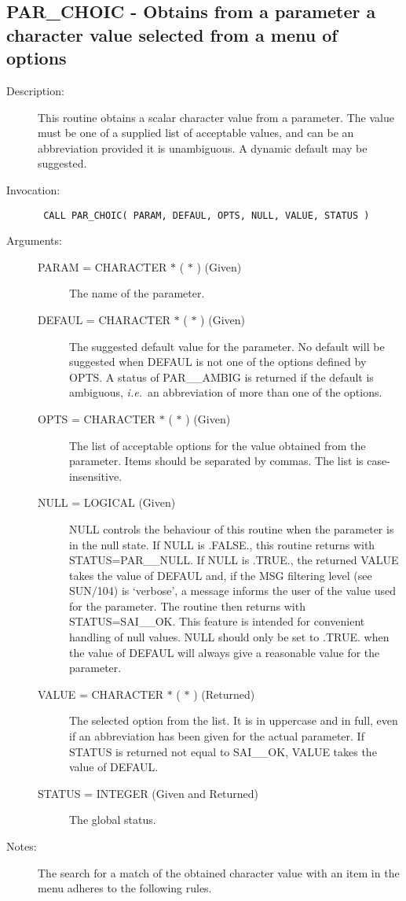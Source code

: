 \documentclass[twoside,11pt]{article}
\newcommand{\xref}[3]{#1}
\newcommand{\xlabel}[1]{}
\newcommand{\latex}[1]{#1}
\newlength{\sstbannerlength}
\newlength{\sstcaptionlength}
\newlength{\sstexampleslength}
\newlength{\sstexampleswidth}
\newcommand{\sstroutine}[3]{
   \goodbreak
   \rule{\textwidth}{0.5mm}
   \vspace{-7ex}
   \newline
   \settowidth{\sstbannerlength}{{\Large {\bf #1}}}
   \setlength{\sstcaptionlength}{\textwidth}
   \setlength{\sstexampleslength}{\textwidth}
   \addtolength{\sstbannerlength}{0.5em}
   \addtolength{\sstcaptionlength}{-2.0\sstbannerlength}
   \addtolength{\sstcaptionlength}{-5.0pt}
   \settowidth{\sstexampleswidth}{{\bf Examples:}}
   \addtolength{\sstexampleslength}{-\sstexampleswidth}
   \parbox[t]{\sstbannerlength}{\flushleft{\Large {\bf #1}}}
   \parbox[t]{\sstcaptionlength}{\center{\Large #2}}
   \parbox[t]{\sstbannerlength}{\flushright{\Large {\bf #1}}}
   \begin{description}
      #3
   \end{description}
}
\newcommand{\sstdescription}[1]{\item[Description:] #1}
\newcommand{\sstinvocation}[1]{\item[Invocation:]\hspace{0.4em}{\tt #1}}
\newcommand{\sstarguments}[1]{
   \item[Arguments:] \mbox{} \\
   \vspace{-3.5ex}
   \begin{description}
      #1
   \end{description}
}
\newcommand{\sstsubsection}[1]{ \item[{#1}] \mbox{} \\}
\newcommand{\sstnotes}[1]{\item[Notes:] \mbox{} \\[1.3ex] #1}
\newcommand{\ssttt}{\tt}
\renewcommand{\sstroutine}[3]{
      \subsection{\xlabel{12}#1\xlabel{#1}-\label{#1}#2}
      \begin{description}
         #3
      \end{description}
   }
\renewcommand{\sstdescription}[1]{\item[Description:]
      \begin{description}
         #1
      \end{description}
   }
\renewcommand{\sstinvocation}[1]{\item[Invocation:]
      \begin{description}
         {\ssttt #1}
      \end{description}
   }
\renewcommand{\sstarguments}[1]{
      \item[Arguments:]
      \begin{description}
         #1
      \end{description}
   }
\renewcommand{\sstsubsection}[1]{\item[{#1}]}
\renewcommand{\sstnotes}[1]{\item[Notes:]
      \begin{description}
         #1
      \end{description}
   }
\begin{document}
\sstroutine{
   PAR\_CHOIC
}{
   Obtains from a parameter a character value selected from a menu
   of options
}{
   \sstdescription{
      This routine obtains a scalar character value from a parameter.
      The value must be one of a supplied list of acceptable values,
      and can be an abbreviation provided it is unambiguous.  A dynamic
      default may be suggested.
   }
   \sstinvocation{
      CALL PAR\_CHOIC( PARAM, DEFAUL, OPTS, NULL, VALUE, STATUS )
   }
   \sstarguments{
      \sstsubsection{
         PARAM = CHARACTER $*$ ( $*$ ) (Given)
      }{
         The name of the parameter.
      }
      \sstsubsection{
         DEFAUL = CHARACTER $*$ ( $*$ ) (Given)
      }{
         The suggested default value for the parameter.  No default
         will be suggested when DEFAUL is not one of the options defined
         by OPTS.  A status of PAR\_\_AMBIG is returned if the default is
         ambiguous, {\it i.e.}\ an abbreviation of more than one of the
         options.
      }
      \sstsubsection{
         OPTS = CHARACTER $*$ ( $*$ ) (Given)
      }{
         The list of acceptable options for the value obtained from the
         parameter.  Items should be separated by commas.  The list is
         case-insensitive.
      }
      \sstsubsection{
         NULL = LOGICAL (Given)
      }{
         NULL controls the behaviour of this routine when the parameter
         is in the null state.  If NULL is .FALSE., this routine
         returns with STATUS=PAR\_\_NULL.  If NULL is .TRUE., the
         returned VALUE takes the value of DEFAUL and, if the
\xref{MSG filtering level}{sun104}{conditional_message_reporting}
\latex{ (see SUN/104)} is `verbose',
         a message informs the user of the value used for
         the parameter. The routine then returns with STATUS=SAI\_\_OK. 
         This feature is intended for convenient handling of null values.
         NULL should only be set to .TRUE. when the value of DEFAUL will
         always give a reasonable value for the parameter.
      }
      \sstsubsection{
         VALUE = CHARACTER $*$ ( $*$ ) (Returned)
      }{
         The selected option from the list.  It is in uppercase and
         in full, even if an abbreviation has been given for the actual
         parameter.  If STATUS is returned not equal to SAI\_\_OK, VALUE
         takes the value of DEFAUL.
      }
      \sstsubsection{
         STATUS = INTEGER (Given and Returned)
      }{
         The global status.
      }
   }
   \sstnotes{
      The search for a match of the obtained character value with an
      item in the menu adheres to the following rules.
}}
\end{document}
